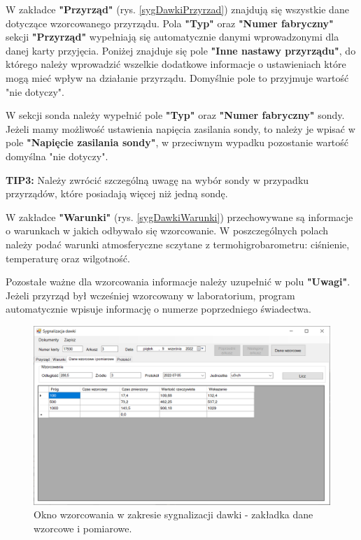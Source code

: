 {{{	W zakładce \textbf{"Przyrząd"} (rys. \ref{sygDawkiPrzyrzad}) znajdują się wszystkie dane dotyczące wzorcowanego przyrządu. Pola \textbf{"Typ"} oraz \textbf{"Numer fabryczny"} sekcji \textbf{"Przyrząd"} wypełniają się automatycznie danymi wprowadzonymi dla danej karty przyjęcia. Poniżej znajduje się pole \textbf{"Inne nastawy przyrządu"}, do którego należy wprowadzić wszelkie dodatkowe informacje o ustawieniach które mogą mieć wpływ na działanie przyrządu. Domyślnie pole to przyjmuje wartość "nie dotyczy".
	
	W sekcji sonda należy wypełnić pole \textbf{"Typ"} oraz \textbf{"Numer fabryczny"} sondy. Jeżeli mamy możliwość ustawienia napięcia zasilania sondy, to należy je wpisać w pole \textbf{"Napięcie zasilania sondy"}, w przeciwnym wypadku pozostanie wartość domyślna "nie dotyczy".
	
	\textbf{TIP3:} Należy zwrócić szczególną uwagę na wybór sondy w przypadku przyrządów, które posiadają więcej niż jedną sondę.
	
	W zakładce \textbf{"Warunki"} (rys. \ref{sygDawkiWarunki}) przechowywane są informacje o warunkach w jakich odbywało się wzorcowanie. W poszczególnych polach należy podać warunki atmosferyczne sczytane z termohigrobarometru: ciśnienie, temperaturę oraz wilgotność.

	Pozostałe ważne dla wzorcowania informacje należy uzupełnić w polu \textbf{"Uwagi"}. Jeżeli przyrząd był wcześniej wzorcowany w laboratorium, program automatycznie wpisuje informację o numerze poprzedniego świadectwa. 
	
	\begin{figure}[htb]
		\centering
		\includegraphics[width=\columnwidth]{obrazki/Wzorcowanie/syg_dawki/dane.png}
		\caption{Okno wzorcowania w zakresie sygnalizacji dawki - zakładka dane wzorcowe i pomiarowe.}
		\label{sygDawkiDane}
	\end{figure}
	
}}}
